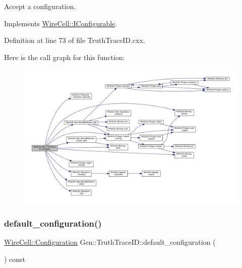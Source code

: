 Accept a configuration. 



Implements \hyperlink{class_wire_cell_1_1_i_configurable_a57ff687923a724093df3de59c6ff237d}{Wire\+Cell\+::\+I\+Configurable}.



Definition at line 73 of file Truth\+Trace\+I\+D.\+cxx.

Here is the call graph for this function\+:
\nopagebreak
\begin{figure}[H]
\begin{center}
\leavevmode
\includegraphics[width=350pt]{class_wire_cell_1_1_gen_1_1_truth_trace_i_d_adeed1a28e9ed6d5da7e07378b172bd48_cgraph}
\end{center}
\end{figure}
\mbox{\label{class_wire_cell_1_1_gen_1_1_truth_trace_i_d_a315b5e6491134d84248cfc2ed8f8e0b1}} 
\subsubsection{\texorpdfstring{default\+\_\+configuration()}{default\_configuration()}}
{\footnotesize\ttfamily \hyperlink{namespace_wire_cell_a9f705541fc1d46c608b3d32c182333ee}{Wire\+Cell\+::\+Configuration} Gen\+::\+Truth\+Trace\+I\+D\+::default\+\_\+configuration (\begin{DoxyParamCaption}{ }\end{DoxyParamCaption}) const\hspace{0.3cm}{\ttfamily [virtual]}}



